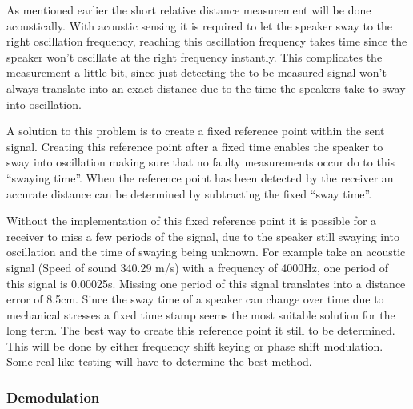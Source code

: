 \documentclass[10pt,a4paper]{article}
\begin{document}
As mentioned earlier the short relative distance measurement will be done acoustically. With acoustic sensing it is required to let the speaker sway to the right oscillation frequency, reaching this oscillation frequency takes time since the speaker won’t oscillate at the right frequency instantly. This complicates the measurement a little bit, since just detecting the to be measured signal won’t always translate into an exact distance due to the time the speakers take to sway into oscillation.

A solution to this problem is to create a fixed reference point within the sent signal. Creating this reference point after a fixed time enables the speaker to sway into oscillation making sure that no faulty measurements occur do to this “swaying time”. When the reference point has been detected by the receiver an accurate distance can be determined by subtracting the fixed “sway time”.

Without the implementation of this fixed reference point it is possible for a receiver to miss a few periods of the signal, due to the speaker still swaying into oscillation and the time of swaying being unknown. For example take an acoustic signal (Speed of sound 340.29 m/s) with a frequency of 4000Hz, one period of this signal is 0.00025s. Missing one period of this signal translates into a distance error of 8.5cm. Since the sway time of a speaker can change over time due to mechanical stresses a fixed time stamp seems the most suitable solution for the long term. The best way to create this reference point it still to be determined. This will be done by either frequency shift keying or phase shift modulation. Some real like testing will have to determine the best method.



\subsubsection{Demodulation}
\end{document}
